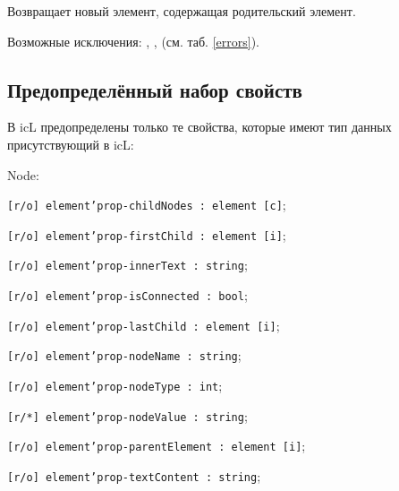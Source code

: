 Возвращает новый элемент, содержащая родительский элемент.

Возможные исключения: , ,  (см. таб. \ref{errors}).

\subsection{Предопределённый набор свойств}
\label{elements:predefined:properties}

В icL предопределены только те свойства, которые имеют тип данных присутствующий в icL:
\begin{icItems}
	\item Node:	
	\begin{icItems}
		\item \texttt{[r/o] element'prop-childNodes : element [c]};
		\item \texttt{[r/o] element'prop-firstChild : element [i]};
		\item \texttt{[r/o] element'prop-innerText : string};
		\item \texttt{[r/o] element'prop-isConnected : bool};
		\item \texttt{[r/o] element'prop-lastChild : element [i]};
		\item \texttt{[r/o] element'prop-nodeName : string};
		\item \texttt{[r/o] element'prop-nodeType : int};
		\item \texttt{[r/*] element'prop-nodeValue : string};
		\item \texttt{[r/o] element'prop-parentElement : element [i]};
		\item \texttt{[r/o] element'prop-textContent : string};
	\end{icItems}
	

\end{icItems}
